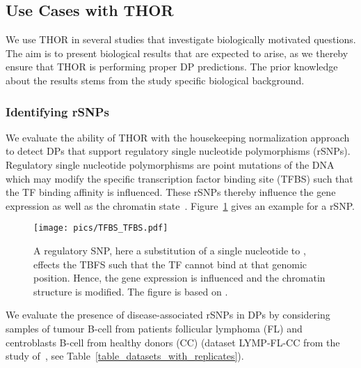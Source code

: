 \subsection{Use Cases with THOR}
We use THOR in several studies that investigate biologically motivated questions.
The aim is to present biological results that are expected to arise, as we thereby ensure that THOR is performing proper DP predictions.
The prior knowledge about the results stems from the study specific biological background.

\subsubsection{Identifying rSNPs}
\label{sec_expmethod_rsnps}
We evaluate the ability of THOR with the housekeeping normalization approach to detect DPs that support regulatory single nucleotide polymorphisms (rSNPs). 
Regulatory single nucleotide polymorphisms are point mutations of the DNA which may modify the specific transcription factor binding site (TFBS) such that the TF binding affinity is influenced.
These rSNPs thereby influence the gene expression as well as the chromatin state~\citep{Hawkins2010, Guo2014}.
Figure~\ref{pic_rsnp_concept} gives an example for a rSNP.

\begin{figure}[ht]
  \centering
  \texttt{[image: pics/TFBS\_TFBS.pdf]}
\caption[Regulatory SNP]{A regulatory SNP, here a substitution of a single nucleotide  to , effects the TBFS such that the TF cannot bind at that genomic position.
Hence, the gene expression is influenced and the chromatin structure is modified.
The figure is based on \cite{Hawkins2010}.
}
\label{pic_rsnp_concept}
\end{figure}


We evaluate the presence of disease-associated rSNPs in DPs by considering samples of tumour B-cell from patients follicular lymphoma (FL) and centroblasts B-cell from healthy donors (CC) (dataset LYMP-FL-CC from the study of~\cite{Koues2015}, see Table~\ref{table_datasets_with_replicates}).

